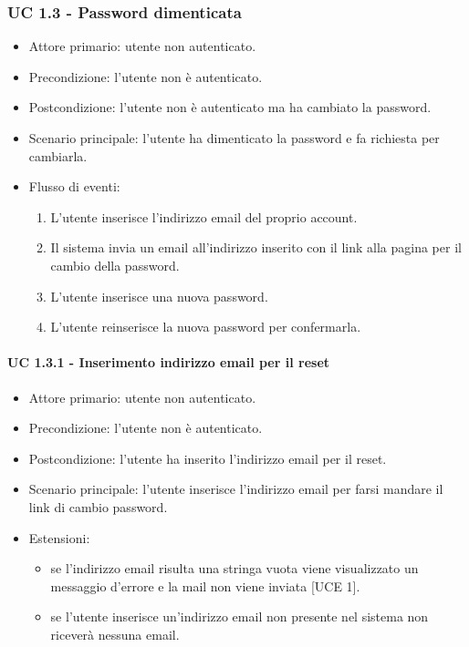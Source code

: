     \subsubsection{UC 1.3 - Password dimenticata}
        \begin{itemize}
            \item Attore primario: utente non autenticato.
            \item Precondizione: l'utente non è autenticato.
            \item Postcondizione: l'utente non è autenticato ma ha cambiato la password.
            \item Scenario principale: l'utente ha dimenticato la password e fa richiesta per cambiarla.
            \item Flusso di eventi:
                \begin{enumerate}
                    \item L'utente inserisce l'indirizzo email del proprio account.
                    \item Il sistema invia un email all'indirizzo inserito con il link alla pagina per il cambio della password.
                    \item L'utente inserisce una nuova password.
                    \item L'utente reinserisce la nuova password per confermarla.
                \end{enumerate}
        \end{itemize}
        \paragraph{UC 1.3.1 - Inserimento indirizzo email per il reset}
            \begin{itemize}
                \item Attore primario: utente non autenticato.
                \item Precondizione: l'utente non è autenticato.
                \item Postcondizione: l'utente ha inserito l'indirizzo email per il reset.
                \item Scenario principale: l'utente inserisce l'indirizzo email per farsi mandare il link di cambio password.
                \item Estensioni:
                    \begin{itemize}
                        \item se l'indirizzo email risulta una stringa vuota viene visualizzato un messaggio d'errore e la mail non viene inviata [UCE 1].
                        \item se l'utente inserisce un'indirizzo email non presente nel sistema non riceverà nessuna email.
                    \end{itemize}
            \end{itemize}
